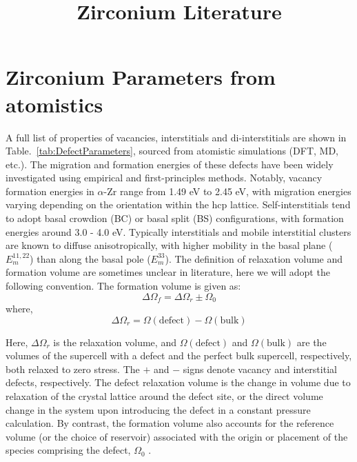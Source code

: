 \documentclass[12pt]{article}
\title{Zirconium Literature}
\begin{document}
\maketitle

\section{Zirconium Parameters from atomistics}
A full list of properties of vacancies, interstitials and di-interstitials are shown in Table.~\ref{tab:DefectParameters}, sourced from atomistic simulations (DFT, MD, etc.). The migration and formation energies of these defects have been widely investigated using empirical and first-principles methods. Notably, vacancy formation energies in $\alpha$-Zr range from 1.49 eV to 2.45 eV, with migration energies varying depending on the orientation within the hcp lattice. Self-interstitials tend to adopt basal crowdion (BC) or basal split (BS) configurations, with formation energies around 3.0 - 4.0 eV. Typically interstitials and mobile interstitial clusters are known to diffuse anisotropically, with higher mobility in the basal plane ($E_m^{11,22}$) than along the basal pole ($E_m^{33}$). The definition of relaxation volume and formation volume are sometimes unclear in literature, here we will adopt the following convention. The formation volume is given as:
\begin{equation}
    \Delta \Omega_f = \Delta \Omega_r \pm \Omega_0
\end{equation}
where,
\begin{equation}
    \Delta \Omega_r = \Omega(\text{defect}) - \Omega(\text{bulk})
\end{equation}

Here, $\Delta \Omega_r$ is the relaxation volume, and $\Omega(\text{defect})$ and $\Omega(\text{bulk})$ are the volumes of the supercell with a defect and the perfect bulk supercell, respectively, both relaxed to zero stress. The $+$ and $-$ signs denote vacancy and interstitial defects, respectively. The defect relaxation volume is the change in volume due to relaxation of the crystal lattice around the defect site, or the direct volume change in the system upon introducing the defect in a constant pressure calculation. By contrast, the formation volume also accounts for the reference volume (or the choice of reservoir) associated with the origin or placement of the species comprising the defect, $\Omega_0$ \cite{goyal2019conundrum}.
\end{document}
